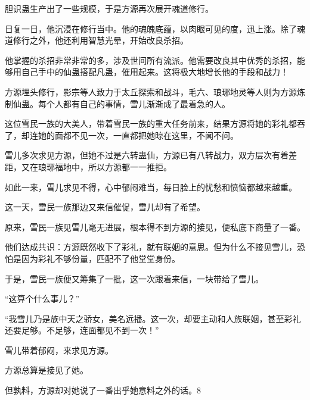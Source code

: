 \begin{this_body}
胆识蛊生产出了一些规模，于是方源再次展开魂道修行。

日复一日，他沉浸在修行当中。他的魂魄底蕴，以肉眼可见的度，迅上涨。除了魂道修行之外，他还利用智慧光晕，开始改良杀招。

他掌握的杀招非常非常的多，涉及世间所有流派。他需要改良其中优秀的杀招，能够用自己手中的仙蛊搭配凡蛊，催用起来。这将极大地增长他的手段和战力！

方源埋头修行，影宗等人致力于太丘探索和战斗，毛六、琅琊地灵等人则为方源炼制仙蛊。每个人都有自己的事情，雪儿渐渐成了最着急的人。

这位雪民一族的大美人，带着雪民一族的重大任务前来，结果方源将她的彩礼都吞了，却连她的面都不见一次，一直都把她晾在这里，不闻不问。

雪儿多次求见方源，但她不过是六转蛊仙，方源已有八转战力，双方层次有着差距，又在琅琊福地中，所以方源都一一推拒。

如此一来，雪儿求见不得，心中郁闷难当，每日脸上的忧愁和愤恼都越来越重。

这一天，雪民一族那边又来信催促，雪儿却有了希望。

原来，雪民一族见雪儿毫无进展，根本得不到方源的接见，便私底下商量了一番。

他们达成共识：方源既然收下了彩礼，就有联姻的意思。但为什么不接见雪儿，恐怕是因为彩礼不够份量，匹配不了他堂堂身份。

于是，雪民一族便又筹集了一批，这一次跟着来信，一块带给了雪儿。

“这算个什么事儿？”

“我雪儿乃是族中天之骄女，美名远播。这一次，却要主动和人族联姻，甚至彩礼还要足够。不足够，连面都见不到一次！”

雪儿带着郁闷，来求见方源。

方源总算是接见了她。

但孰料，方源却对她说了一番出乎她意料之外的话。8

\end{this_body}

